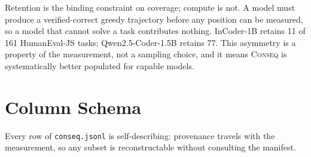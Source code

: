 Retention is the binding constraint on coverage; compute is not. A model must produce a
verified-correct greedy trajectory before any position can be measured, so a model that cannot solve
a task contributes nothing. InCoder-1B retains 11 of 161 HumanEval-JS tasks; Qwen2.5-Coder-1.5B
retains 77. This asymmetry is a property of the measurement, not a sampling choice, and it means
\textsc{Conseq} is systematically better populated for capable models.


\section{Column Schema}
\label{app:schema}

Every row of \texttt{conseq.jsonl} is self-describing: provenance travels with the measurement, so
any subset is reconstructable without consulting the manifest.

